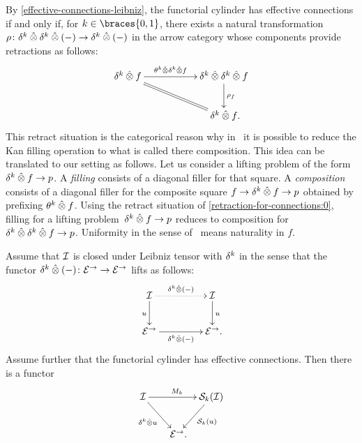 \documentclass[reqno,10pt,a4paper,oneside,draft]{amsart}
\begin{document}
\begin{remark} \label{retraction-for-connections}
By \cref{effective-connections-leibniz}, the functorial cylinder has effective connections if and only if, for $k \in \braces{0, 1}$, there exists a natural transformation $\rho \co \kcyl \hatotimes \kcyl \hatotimes (-) \to \kcyl \hatotimes (-)$ in the arrow category whose components provide retractions as follows:
\begin{equation} \label{retraction-for-connections:0}
\xymatrix@C+3em{
  \kcyl \hatotimes f
  \ar[r]^-{\thetak \hatotimes \kcyl \hatotimes f}
  \ar@{=}[dr]
&
  \kcyl \hatotimes \kcyl \hatotimes f
  \ar[d]^{\rho_f}
\\&
  \kcyl \hatotimes f
\rlap{.}}
\end{equation}
This retract situation is the categorical reason why in~\cite{cohen-et-al:cubicaltt} it is possible to reduce the Kan filling operation to what is called there composition.
This idea can be translated to our setting as follows.
Let us consider a lifting problem of the form $\kcyl \hatotimes f \to p$.
A \emph{filling} consists of a diagonal filler for that square.
A \emph{composition} consists of a diagonal filler for the composite square $f \to \kcyl \hatotimes f \to p$ obtained by prefixing $\theta^k \hatotimes f$.
Using the retract situation of \eqref{retraction-for-connections:0}, filling for a lifting problem~$\kcyl \hatotimes f \to p$ reduces to composition for~$\kcyl \hatotimes \kcyl \hatotimes f \to p$.
Uniformity in the sense of~\cite{cohen-et-al:cubicaltt} means naturality in $f$.
\end{remark}

\begin{lemma} \label{lem:to-strong-hequiv}
Assume that $\cal{I}$ is closed under Leibniz tensor with $\kcyl$ in the sense that the functor $\kcyl \hatotimes (-) \co \catE^\to \to \catE^\to$ lifts as follows:
\begin{equation} \label{to-strong-hequiv:0}
\begin{gathered}
\xymatrix@C+2em{
  \cal{I}
  \ar[d]_{u}
  \ar@{.>}[r]^{\kcyl \hatotimes (-)}
&
  \cal{I}
  \ar[d]^{u}
\\
  \catE^\to
  \ar[r]_{\kcyl \hatotimes (-)}
&
  \catE^\to
\rlap{.}}
\end{gathered}
\end{equation}
Assume further that the functorial cylinder has effective connections.
Then there is a functor
\[
\xymatrix@!C@C-2em{
  \cal{I}
  \ar[dr]_{\kcyl \hatotimes u} \ar[rr]^{M_k}
&&
  \cal{S}_k(\cal{I})
  \ar[dl]^{\cal{S}_k(u)}
\\&
   \catE^\to
\rlap{.}}
\]
\end{lemma}
\end{document}
